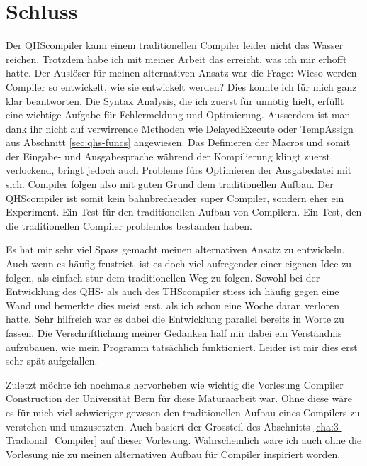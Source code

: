 \chapter{Schluss}
Der QHScompiler kann einem traditionellen Compiler leider nicht das Wasser reichen.
Trotzdem habe ich mit meiner Arbeit das erreicht, was ich mir erhofft hatte. Der Auslöser für meinen alternativen Ansatz war die Frage: Wieso werden Compiler so entwickelt, wie sie entwickelt werden? 
Dies konnte ich für mich ganz klar beantworten. Die Syntax Analysis, die ich zuerst für unnötig hielt, erfüllt eine wichtige Aufgabe für Fehlermeldung und Optimierung.
Ausserdem ist man dank ihr nicht auf verwirrende Methoden wie DelayedExecute oder TempAssign aus Abschnitt \ref{sec:qhs-funcs} angewiesen.
Das Definieren der Macros und somit der Eingabe- und Ausgabesprache während der Kompilierung klingt zuerst verlockend, bringt jedoch auch Probleme fürs Optimieren der Ausgabedatei mit sich.
Compiler folgen also mit guten Grund dem traditionellen Aufbau.
Der QHScompiler ist somit kein bahnbrechender super Compiler, sondern eher ein Experiment.
Ein Test für den traditionellen Aufbau von Compilern. Ein Test, den die traditionellen Compiler problemlos bestanden haben.

Es hat mir sehr viel Spass gemacht meinen alternativen Ansatz zu entwickeln. Auch wenn es häufig frustriet, ist es doch viel aufregender einer eigenen Idee zu folgen, als einfach stur dem traditionellen Weg zu folgen.
Sowohl bei der Entwicklung des QHS- als auch des THScompiler stiess ich häufig gegen eine Wand und bemerkte dies meist erst, als ich schon eine Woche daran verloren hatte.
Sehr hilfreich war es dabei die Entwicklung parallel bereits in Worte zu fassen. Die Verschriftlichung meiner Gedanken half mir dabei ein Verständnis aufzubauen, wie mein Programm tatsächlich funktioniert.
Leider ist mir dies erst sehr spät aufgefallen.

Zuletzt möchte ich nochmals hervorheben wie wichtig die Vorlesung Compiler Construction der Universität Bern für diese Maturaarbeit war.
Ohne diese wäre es für mich viel schwieriger gewesen den traditionellen Aufbau eines Compilers zu verstehen und umzusetzten.
Auch basiert der Grossteil des Abschnitts \ref{cha:3-Tradional_Compiler} auf dieser Vorlesung.
Wahrscheinlich wäre ich auch ohne die Vorlesung nie zu meinen alternativen Aufbau für Compiler inspiriert worden.
